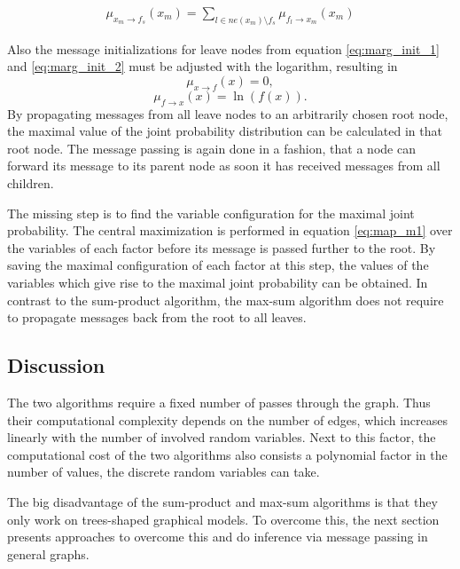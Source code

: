 \documentclass{sigkdd}
\begin{document}
\begin{equation}\label{eq:map_m2}
\begin{split}
\mu_{x_m \rightarrow f_s}(x_m) = \sum_{l \in ne(x_m) \setminus f_s} \mu_{f_l \rightarrow x_m}(x_m)
\end{split}
\end{equation}

Also the message initializations for leave nodes from equation \ref{eq:marg_init_1} and \ref{eq:marg_init_2} must be adjusted with the logarithm, resulting in
\begin{equation}\label{eq:marg_init2_1}
\mu_{x \rightarrow f}(x) = 0,
\end{equation}
\begin{equation}\label{eq:marg_init2_2}
\mu_{f \rightarrow x}(x) = \ln(f(x)).
\end{equation}
By propagating messages from all leave nodes to an arbitrarily chosen root node, the maximal value of the joint probability distribution can be calculated in that root node. The message passing is again done in a fashion, that a node can forward its message to its parent node as soon it has received messages from all children.

The missing step is to find the variable configuration for the maximal joint probability. The central maximization is performed in equation \ref{eq:map_m1} over the variables of each factor before its message is passed further to the root. By saving the maximal configuration of each factor at this step, the values of the variables which give rise to the maximal joint probability can be obtained. In contrast to the sum-product algorithm, the max-sum algorithm does not require to propagate messages back from the root to all leaves.

\subsection{Discussion}
The two algorithms require a fixed number of passes through the graph. Thus their computational complexity depends on the number of edges, which increases linearly with the number of involved random variables. Next to this factor, the computational cost of the two algorithms also consists a polynomial factor in the number of values, the discrete random variables can take.

The big disadvantage of the sum-product and max-sum algorithms is that they only work on trees-shaped graphical models. To overcome this, the next section presents approaches to overcome this and do inference via message passing in general graphs.
\end{document}
